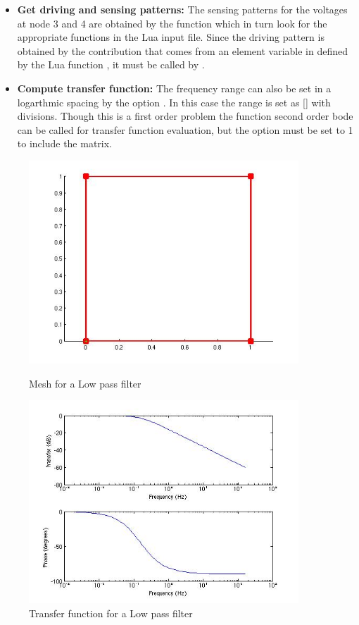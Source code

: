 \begin{itemize}

  \item{\textbf{Get driving and sensing patterns:}}
  The sensing patterns for the voltages at node 3 and 4
  are obtained by the function 
  which in turn look for the appropriate functions in the
  Lua input file. Since the driving pattern is obtained
  by the contribution that comes from an element variable
  in  defined by the Lua function 
  , it must be called by 
  .

  \item{\textbf{Compute transfer function:}}
  The frequency range can also be set in a logarthmic
  spacing by the option . In this case
  the range is set as []
  with  divisions. Though this is a first
  order problem the function second order bode can be 
  called for transfer function evaluation, but the 
  option   must be set to 1 to include the 
   matrix.

\end{itemize}

\begin{figure}[htbp]
\centering
\includegraphics[height = 3in]{fig/low_pass_filter_mesh.jpg}
\caption{Mesh for a Low pass filter}
\label{fig:LowPassFilterMesh}
\includegraphics[height = 3in]{fig/low_pass_filter_transfer.jpg}
\caption{Transfer function  for a Low pass filter}
\label{fig:LowPassFilterTransfer}
\end{figure}

